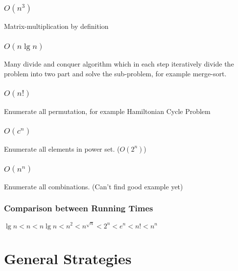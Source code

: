 			\subsection{\texorpdfstring{$O(n^3)$}{O(n3)}}
				\begin{example}
					Matrix-multiplication by definition
				\end{example}

			\subsection{\texorpdfstring{$O(n\lg n)$}{O(nlgn)}}
				\begin{example}
					Many divide and conquer algorithm which in each step iteratively divide the problem into two part and solve the sub-problem, for example merge-sort.
				\end{example}

			\subsection{\texorpdfstring{$O(n!)$}{O(n!)}}
				\begin{example}
					Enumerate all permutation, for example Hamiltonian Cycle Problem
				\end{example}

			\subsection{\texorpdfstring{$O(c^n)$}{O(cn)}}
				\begin{example}
					Enumerate all elements in power set. ($O(2^n)$)
				\end{example}

			\subsection{\texorpdfstring{$O(n^n)$}{O(nn)}}
				\begin{example}
					Enumerate all combinations. (Can't find good example yet)
				\end{example}

			\subsection{Comparison between Running Times}
				$\lg n < n < n\lg n < n^2 < n^{\sqrt{n}} < 2^n < e^n < n! < n^n$

	\chapter{General Strategies}
